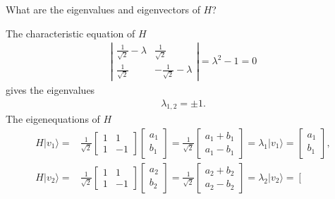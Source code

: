 \documentclass[en]{sol-man}
\begin{document}
\begin{exe}
    What are the eigenvalues and eigenvectors of $H$?
\end{exe}
\begin{sol}
    The characteristic equation of $H$
    \begin{align}
        \left\lvert\begin{matrix}
            \frac{1}{\sqrt{2}}-\lambda&\frac{1}{\sqrt{2}}\\
            \frac{1}{\sqrt{2}}&-\frac{1}{\sqrt{2}}-\lambda
        \end{matrix}\right\rvert=\lambda^2-1=0
    \end{align}
    gives the eigenvalues
    \begin{align}
        \lambda_{1,2}=\pm 1.
    \end{align}
    The eigenequations of $H$
    \begin{align}
        H\lvert v_1\rangle=&\frac{1}{\sqrt{2}}\left[\begin{matrix}
            1&1\\
            1&-1
        \end{matrix}\right]\left[\begin{matrix}
            a_1\\
            b_1
        \end{matrix}\right]=\frac{1}{\sqrt{2}}\left[\begin{matrix}
            a_1+b_1\\
            a_1-b_1
        \end{matrix}\right]=\lambda_1\lvert v_1\rangle=\left[\begin{matrix}
            a_1\\
            b_1
        \end{matrix}\right],\\
        H\lvert v_2\rangle=&\frac{1}{\sqrt{2}}\left[\begin{matrix}
            1&1\\
            1&-1
        \end{matrix}\right]\left[\begin{matrix}
            a_2\\
            b_2
        \end{matrix}\right]=\frac{1}{\sqrt{2}}\left[\begin{matrix}
            a_2+b_2\\
            a_2-b_2
        \end{matrix}\right]=\lambda_2\lvert v_2\rangle=\left[\begin{matrix}

\end{matrix}
\end{align}
\end{sol}
\end{document}
